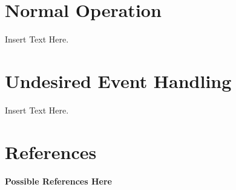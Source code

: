 \documentclass [11pt]{article}
\begin{document}
%
%
%
%
%
%
%
%
%



\section{Normal Operation}
Insert Text Here. 


\section{Undesired Event Handling}
Insert Text Here. 



\section{References}
\textbf{Possible References Here}

\end{document}
